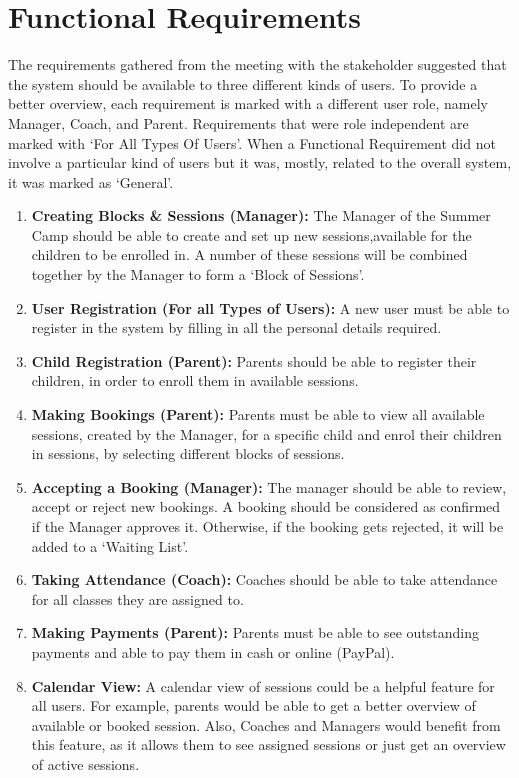 \documentclass{l3proj}
\begin{document}
\section{Functional Requirements}
\par 
The requirements gathered from the meeting with the stakeholder suggested that the system should be available to three different kinds of users. To provide a better overview, each requirement is marked with a different user role, namely Manager, Coach, and Parent. Requirements that were role independent are marked with `For All Types Of Users'. When a Functional Requirement did not involve a particular kind of users but it was, mostly, related to the overall system, it was marked as `General'.
\begin{enumerate}
	\item \textbf{Creating Blocks \& Sessions (Manager):} The Manager of the Summer Camp should be able to create and set up new sessions,available for the children to be enrolled in. A number of these sessions will be combined together by the Manager to form a `Block of Sessions'.
	\item \textbf{User Registration (For all Types of Users):} A new user must be able to register in the system by filling in all the personal details required.
	\item \textbf{Child Registration (Parent):} Parents should be able to register their children, in order to enroll them in available sessions.
	\item \textbf{Making Bookings (Parent):} Parents must be able to view all available sessions, created by the Manager, for a specific child and enrol their children in sessions, by selecting different blocks of sessions.
	\item \textbf{Accepting a Booking (Manager):} The manager should be able to review, accept or reject new bookings. A booking should be considered as confirmed if the Manager approves it. Otherwise, if the booking gets rejected, it will be added to a `Waiting List'. 
	\item \textbf{Taking Attendance (Coach):} Coaches should be able to take attendance for all classes they are assigned to.
	\item \textbf{Making Payments (Parent):} Parents must be able to see outstanding payments and able to pay them in cash or online (PayPal).
	\item \textbf{Calendar View:} A calendar view of sessions could be a helpful feature for all users. For example, parents would be able to get a better overview of available or booked session. Also, Coaches and Managers would benefit from this feature, as it allows them to see assigned sessions or just get an overview of active sessions.

\end{enumerate}
\end{document}
